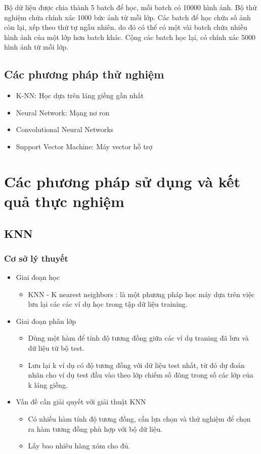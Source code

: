 \documentclass[a4paper,12pt]{report}
\begin{document}
Bộ dữ liệu được chia thành 5 batch để học, mỗi batch có 10000 hình ảnh. Bộ thử nghiệm chứa chính xác 1000 bức ảnh từ mỗi lớp. Các batch để học chứa số ảnh còn lại, xếp theo thứ tự ngẫu nhiên, do đó có thể có một vài batch chứa nhiều hình ảnh của một lớp hơn batch khác. Cộng các batch học lại, có chính xác 5000 hình ảnh từ mỗi lớp.
\section{Các phương pháp thử nghiệm}
\begin{itemize}
\item K-NN: Học dựa trên láng giềng gần nhất
\item Neural Network: Mạng nơ ron
\item Convolutional Neural Networks
\item Support Vector Machine: Máy vector hỗ trợ
\end{itemize}
\chapter{Các phương pháp sử dụng và kết quả thực nghiệm}
\section{KNN}
\subsection{Cơ sở lý thuyết}
\begin{itemize}
\item Giai đoạn học
\begin{itemize}
\item KNN - K nearest neighbors : là một phương pháp học máy dựa trên việc lưu lại các các ví dụ học trong tập dữ liệu training.
\end{itemize}
\item Giai đoạn phân lớp
\begin{itemize}
\item Dùng một hàm để tính độ tương đồng giữa các ví dụ traning đã lưu và dữ liệu từ bộ test. 
\item Lưu lại k ví dụ có độ tương đồng với dữ liệu test nhất, từ đó dự đoán nhãn cho ví dụ test đầu vào theo lớp chiếm số đông trong số các lớp của k láng giềng. 
\end{itemize}
\item Vấn đề cần giải quyết với giải thuật KNN
\begin{itemize}
\item Có nhiều hàm tính độ tương đồng, cần lựa chọn và thử nghiệm để chọn ra hàm tương đồng phù hợp với bộ dữ liệu.
\item Lấy bao nhiêu hàng xóm cho đủ. 
\end{itemize}
\end{itemize}
\end{document}
